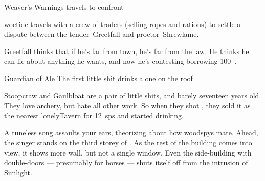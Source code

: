\documentclass[10pt,twoside]{book}
\begin{document}






\pagestyle{minizine}%

{Weaver's Warnings}%
{ travels to confront }%

\Gls{woetide} travels with a crew of traders (selling ropes and \glspl{ration}) to settle a dispute between the \gls{tender}~Greetfall and \gls{proctor}~Shrewlame.

\begin{speechtext}
  Greetfall thinks that if he's far from town, he's far from the law.
  He thinks he can lie about anything he wants, and now he's contesting borrowing 100~.
\end{speechtext}


{Guardian of Ale}%
{The first little shit drinks alone on the roof}%

Stoopcraw and Gaulbloat are a pair of little shits, and barely seventeen years old.
They love archery, but hate all other work.
So when they shot , they sold it as the nearest \gls{lonelyTavern} for 12~\glspl{sp} and started drinking.


\begin{boxtext}
  A tuneless song assaults your ears, theorizing about how \glspl{woodspy} mate.
  Ahead, the singer stands on the third storey of .
  As the rest of the building comes into view, it shows more wall, but not a single window.
  Even the side-building with double-doors --- presumably for horses --- shuts itself off from the intrusion of Sunlight.
\end{boxtext}

\end{document}

